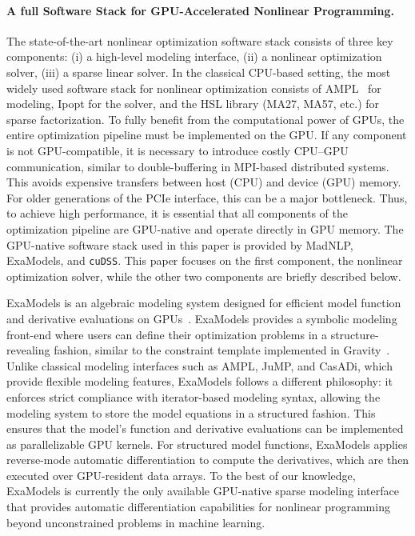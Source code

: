\documentclass[smallextended]{svjour3}
\begin{document}
\paragraph{A full Software Stack for GPU-Accelerated Nonlinear Programming.}
The state-of-the-art nonlinear optimization software stack consists of three key components:
(i) a high-level modeling interface,
(ii) a nonlinear optimization solver,
(iii) a sparse linear solver.
In the classical CPU-based setting, the most widely used software stack for nonlinear optimization consists of AMPL~\cite{fourer1990ampl} for modeling, Ipopt for the solver, and the HSL library (MA27, MA57, etc.) for sparse factorization.
To fully benefit from the computational power of GPUs, the entire optimization pipeline must be implemented on the GPU.
If any component is not GPU-compatible, it is necessary to introduce costly CPU–GPU communication, similar to double-buffering in MPI-based distributed systems.
This avoids expensive transfers between host (CPU) and device (GPU) memory.
For older generations of the PCIe interface, this can be a major bottleneck.
Thus, to achieve high performance, it is essential that all components of the optimization pipeline are GPU-native and operate directly in GPU memory.
The GPU-native software stack used in this paper is provided by MadNLP, ExaModels, and {\tt cuDSS}.
This paper focuses on the first component, the nonlinear optimization solver, while the other two components are briefly described below.

ExaModels is an algebraic modeling system designed for efficient model function and derivative evaluations on GPUs~\cite{shin2023accelerating}.
ExaModels provides a symbolic modeling front-end where users can define their optimization problems in a structure-revealing fashion, similar to the constraint template implemented in Gravity~\cite{hijazi2018gravity}.
Unlike classical modeling interfaces such as AMPL, JuMP, and CasADi, which provide flexible modeling features, ExaModels follows a different philosophy: it enforces strict compliance with iterator-based modeling syntax, allowing the modeling system to store the model equations in a structured fashion.
This ensures that the model's function and derivative evaluations can be implemented as parallelizable GPU kernels.
For structured model functions, ExaModels applies reverse-mode automatic differentiation to compute the derivatives, which are then executed over GPU-resident data arrays.
To the best of our knowledge, ExaModels is currently the only available GPU-native sparse modeling interface that provides automatic differentiation capabilities for nonlinear programming beyond unconstrained problems in machine learning.
\end{document}
